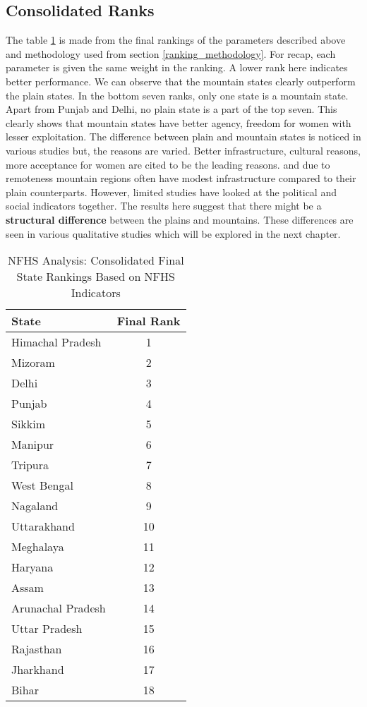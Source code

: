 \subsection{Consolidated Ranks}
 The table \ref{tab:consolidated_ranks} is made from the final rankings of the parameters described above and methodology used from section \ref{ranking_methodology}. For recap, each parameter is given the same weight in the ranking. A lower rank here indicates better performance. We can observe that the mountain states clearly outperform the plain states. In the bottom seven ranks, only one state is a mountain state. Apart from Punjab and Delhi, no plain state is a part of the top seven. This clearly shows that mountain states have better agency, freedom for women with lesser exploitation. The difference between plain and mountain states is noticed in various studies  \citep{kishor2004women} but, the reasons are varied. Better infrastructure, cultural reasons, more acceptance for women are cited to be the leading reasons. and due to remoteness mountain regions often have modest infrastructure compared to their plain counterparts. However, limited studies have looked at the political and social indicators together. The results here suggest that there might be a \textbf{structural difference} between the plains and mountains. These differences are seen in various qualitative studies which will be explored in the next chapter.
\begin{table}[h!]
\centering
\begin{tabular}{|l|c|}
\hline
\textbf{State} & \textbf{Final Rank} \\
\hline
Himachal Pradesh & 1 \\
Mizoram & 2 \\
Delhi & 3 \\
Punjab & 4 \\
Sikkim & 5 \\
Manipur & 6 \\
Tripura & 7 \\
West Bengal & 8 \\
Nagaland & 9 \\
Uttarakhand & 10 \\
Meghalaya & 11 \\
Haryana & 12 \\
Assam & 13 \\
Arunachal Pradesh & 14 \\
Uttar Pradesh & 15 \\
Rajasthan & 16 \\
Jharkhand & 17 \\
Bihar & 18 \\
\hline
\end{tabular}
\caption{NFHS Analysis: Consolidated Final State Rankings Based on NFHS Indicators}
\label{tab:consolidated_ranks}
\end{table}
